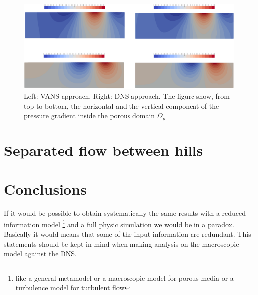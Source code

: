 \begin{figure}[h]
	\centering
	\includegraphics[width=1\linewidth]{chapter_5/figure/re1000/vans_p}
	\caption{Left: VANS approach. Right: DNS approach. The figure show, from top to bottom, the horizontal and the vertical component of the pressure gradient inside the porous domain $\Omega_p$}
	\label{fig:1000_p}
\end{figure}


\section{Separated flow between hills}




\section{Conclusions}

If it would be possible to obtain systematically the same results with a reduced information model \footnote{like a general metamodel or a macroscopic model for porous media or a turbulence model for turbulent flow} and a full physic simulation we would be in a paradox. Basically it would means that some of the input information are redundant. This statements should be kept in mind when making analysis on the macroscopic model against the DNS.


